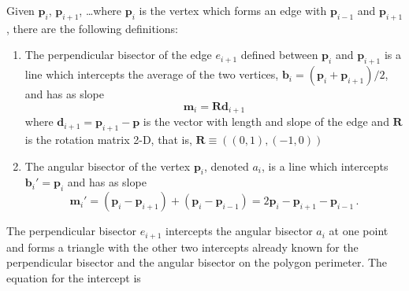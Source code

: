 \documentclass{article}
\begin{document}
%
%
%
%
%
%
%

Given $\mathbf{p}_i$, $\mathbf{p}_{i+1}$, \ldots where $\mathbf{p}_i$ is the vertex which forms an edge with $\mathbf{p}_{i-1}$ and $\mathbf{p}_{i+1}$, there are the following definitions:

\begin{enumerate}
    \item The perpendicular bisector of the edge $e_{i+1}$ defined between $\mathbf{p}_i$ and $\mathbf{p}_{i+1}$ is a line which intercepts the average of the two vertices, $\mathbf{b}_i = (\mathbf{p}_i + \mathbf{p}_{i+1})/2$, and has as slope $$\mathbf{m}_i = \mathbf{R}\mathbf{d}_{i+1}$$ where $\mathbf{d}_{i+1} = \mathbf{p}_{i+1} - \mathbf{p}$ is the vector with length and slope of the edge and $\mathbf{R}$ is the rotation matrix 2-D, that is, $\mathbf{R} \equiv ((0,1),(-1,0))$
    \item The angular bisector of the vertex $\mathbf{p}_i$, denoted $a_i$, is a line which intercepts $\mathbf{b}_i' = \mathbf{p}_i$ and has as slope 
        $$ \mathbf{m}_i' = (\mathbf{p}_i - \mathbf{p}_{i+1}) + (\mathbf{p}_i - \mathbf{p}_{i-1})  = 2\mathbf{p}_i - \mathbf{p}_{i+1} - \mathbf{p}_{i-1} \,. $$
\end{enumerate}

The perpendicular bisector $e_{i+1}$ intercepts the angular bisector $a_i$ at one point and forms a triangle with the other two intercepts already known for the perpendicular bisector and the angular bisector on the polygon perimeter. The equation for the intercept is
\end{document}
